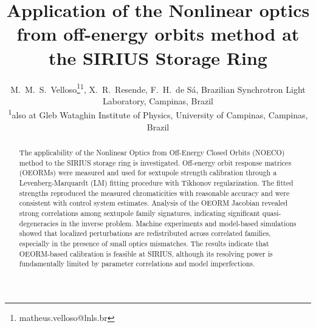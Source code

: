 \documentclass[%
               ]{jacow}
\begin{document}
\title{Application of the Nonlinear optics from off-energy orbits method at the SIRIUS Storage Ring}


\author{M.~M.~S.~Velloso\thanks{matheus.velloso@lnls.br}\textsuperscript{1}, X.~R.~Resende, F.~H.~de Sá, Brazilian Synchrotron Light Laboratory, Campinas, Brazil\\
\textsuperscript{1}also at Gleb Wataghin Institute of Physics, University of Campinas, Campinas, Brazil
}

\maketitle


\begin{abstract}
 The applicability of the Nonlinear Optics from Off-Energy Closed Orbits (NOECO) method to the SIRIUS storage ring is investigated. Off-energy orbit response matrices (OEORMs) were measured and used for sextupole strength calibration through a Levenberg-Marquardt (LM) fitting procedure with Tikhonov regularization. The fitted strengths reproduced the measured chromaticities with reasonable accuracy and were consistent with control system estimates. Analysis of the OEORM Jacobian revealed strong correlations among sextupole family signatures, indicating significant quasi-degeneracies in the inverse problem. Machine experiments and model-based simulations showed that localized perturbations are redistributed across correlated families, especially in the presence of small optics mismatches. The results indicate that OEORM-based calibration is feasible at SIRIUS, although its resolving power is fundamentally limited by parameter correlations and model imperfections.
\end{abstract}
\end{document}
